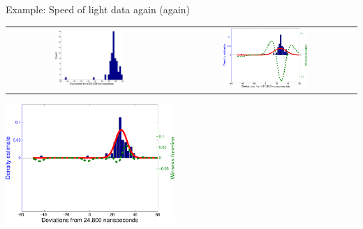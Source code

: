 \begin{frame}{Example: Speed of light data again (again)}
  \begin{center}
  \begin{tabular}{cc}
    \includegraphics[width=0.435\textwidth]{figures/newcomb_hist} &
    \pause
    \includegraphics[width=0.48\textwidth]{figures/newcomb_witness_1}
  \end{tabular}
  \end{center}
  \pause
  \begin{center}
    \includegraphics[width=0.48\textwidth]{figures/newcomb_witness_2}
  \end{center}
\end{frame}

